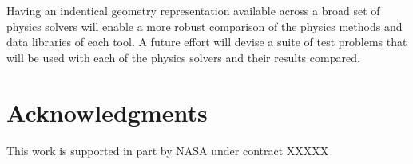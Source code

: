 \documentclass{anstrans}
\begin{document}
Having an indentical geometry representation available across a broad
set of physics solvers will enable a more robust comparison of the
physics methods and data libraries of each tool.  A future effort will
devise a suite of test problems that will be used with each of the
physics solvers and their results compared.

\section{Acknowledgments}
This work is supported in part by NASA under contract XXXXX



\end{document}
